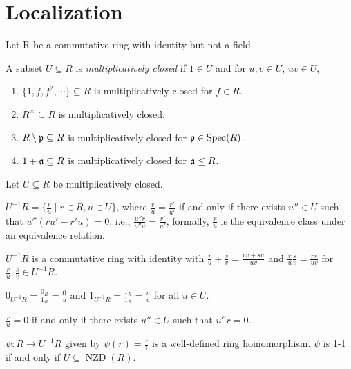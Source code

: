 \chapter{Localization}

Let R be a commutative ring with identity but not a field.

\begin{recall}
    A subset $U \subseteq R$ is \emph{multiplicatively closed} if $1 \in U$ and for $u,v \in U$, $uv \in U$, 
\end{recall}

\begin{example}
    \begin{enumerate}
        \item $\{1,f,f^2,\cdots\} \subseteq R$ is multiplicatively closed for $f \in R$.
        \item $R^\times \subseteq R$ is multiplicatively closed.
        \item $R \setminus \mathfrak{p} \subseteq R$ is multiplicatively closed for $\mathfrak{p} \in \operatorname{Spec}(R)$.
        \item $1 + \mathfrak{a} \subseteq R$ is multiplicatively closed for $\mathfrak{a} \leq R$.
    \end{enumerate}
\end{example}

\noindent Let $U \subseteq R$ be multiplicatively closed.

\begin{recall} \label{defOfMultiplicativelyClosedSet}
    $U^{-1}R = \{\frac{r}{u} \mid r \in R, u \in U\}$, where $\frac{r}{u} = \frac{r'}{u'}$ if and only if there exists $u'' \in U$ such that $u''(ru'-r'u) = 0$, i.e., $\frac{u''r}{u''u} = \frac{r'}{u'}$, formally, $\frac{r}{u}$ is the equivalence class under an equivalence relation. \par 
    $U^{-1}R$ is a commutative ring with identity with $\frac{r}{u} + \frac{s}{v} = \frac{rv+su}{uv}$ and $\frac{r}{u} \frac{s}{v} = \frac{rs}{uv}$ for $\frac{r}{u},\frac{s}{v} \in U^{-1}R$. \par 
    $0_{U^{-1}R} = \frac{0_R}{1_R} = \frac{0}{u}$ and $1_{U^{-1}R} = \frac{1_{R}}{1_{R}} = \frac{u}{u}$ for all $u \in U$. \par 
    $\frac{r}{u} = 0$ if and only if there exists $u'' \in U$ such that $u''r = 0$. \par 
    $\psi: R \to U^{-1}R$ given by $\psi(r) = \frac{r}{1}$ is a well-defined ring homomorphism. $\psi$ is 1-1 if and only if $U \subseteq \operatorname{NZD}(R)$. 
\end{recall}

